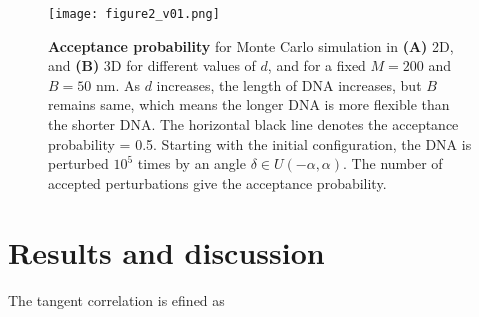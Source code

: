 \documentclass{scrartcl}
\begin{document}
\begin{figure}
\label{figure2}
\centering
\texttt{[image: figure2\_v01.png]}
\caption{\textbf{Acceptance probability} for Monte Carlo simulation in \textbf{(A)} 2D, and \textbf{(B)} 3D for different values of $d$, and for a fixed $M = 200$ and $B = 50$ nm. As $d$ increases, the length of DNA increases, but $B$ remains same, which means the longer DNA is more flexible than the shorter DNA. The horizontal black line denotes the acceptance probability = 0.5. Starting with the initial configuration, the DNA is perturbed $10^5$ times by an angle $\delta \in U(-\alpha,\alpha)$. The number of accepted perturbations give the acceptance probability.}
\end{figure}

\section{Results and discussion}
\label{results}
The tangent correlation is efined as 



\end{document}
